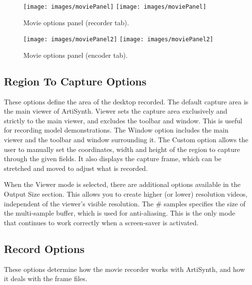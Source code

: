 \documentclass{article}
\begin{document}
\begin{figure}
\begin{center}
\iflatexml
\texttt{[image: images/moviePanel]}
\else
\texttt{[image: images/moviePanel]}
\fi
\end{center}
\caption{Movie options panel (recorder tab).}%
\label{movieOptionsRecorderFig}
\end{figure}

\begin{figure}
\begin{center}
\iflatexml
\texttt{[image: images/moviePanel2]}
\else
\texttt{[image: images/moviePanel2]}
\fi
\end{center}
\caption{Movie options panel (encoder tab).}%
\label{movieOptionsEncoderFig}
\end{figure}

\subsection{Region To Capture Options}

These options define the area of the desktop recorded. The default
capture area is the main viewer of ArtiSynth. {\sf Viewer} sets the capture
area exclusively and strictly to the main viewer, and excludes the toolbar
and window. This is useful for recording model demonstrations. The
{\sf Window} option includes the main viewer and the toolbar and window
surrounding it. The {\sf Custom} option allows the user to manually set the 
coordinates, width and height of the region to capture through the given
fields.  It also displays the capture frame, which can be stretched and 
moved to adjust what is recorded.

When the {\sf Viewer} mode is selected, there are additional options
available in the {\sf Output Size} section.  This allows you to create
higher (or lower) resolution videos, independent of the viewer's 
visible resolution.  The {\sf \# samples} specifies the size of the
multi-sample buffer, which is used for anti-aliasing.  This is the
only mode that continues to work correctly when a screen-saver
is activated.  

\subsection{Record Options}

These options determine how the movie recorder works with ArtiSynth,
and how it deals with the frame files.
\end{document}
